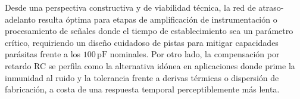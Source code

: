Desde una perspectiva constructiva y de viabilidad técnica, la red de atraso-adelanto resulta óptima para etapas de amplificación
de instrumentación o procesamiento de señales donde el tiempo de establecimiento sea un parámetro crítico, requiriendo un diseño
cuidadoso de pistas para mitigar capacidades parásitas frente a los $100\,\si{\pico\farad}$ nominales. Por otro lado, la
compensación por retardo RC se perfila como la alternativa idónea en aplicaciones donde prime la inmunidad al ruido y la
tolerancia frente a derivas térmicas o dispersión de fabricación, a costa de una respuesta temporal perceptiblemente más lenta.
